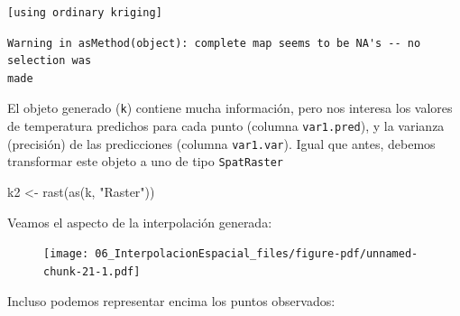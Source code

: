 \documentclass[
  letterpaper,
  DIV=11,
  numbers=noendperiod]{scrreprt}
\newenvironment{Shaded}{\begin{snugshade}}{\end{snugshade}}
\newcommand{\AttributeTok}[1]{\textcolor[rgb]{0.40,0.45,0.13}{#1}}
\newcommand{\DecValTok}[1]{\textcolor[rgb]{0.68,0.00,0.00}{#1}}
\newcommand{\FloatTok}[1]{\textcolor[rgb]{0.68,0.00,0.00}{#1}}
\newcommand{\FunctionTok}[1]{\textcolor[rgb]{0.28,0.35,0.67}{#1}}
\newcommand{\NormalTok}[1]{\textcolor[rgb]{0.00,0.23,0.31}{#1}}
\newcommand{\OtherTok}[1]{\textcolor[rgb]{0.00,0.23,0.31}{#1}}
\newcommand{\SpecialCharTok}[1]{\textcolor[rgb]{0.37,0.37,0.37}{#1}}
\newcommand{\StringTok}[1]{\textcolor[rgb]{0.13,0.47,0.30}{#1}}
\begin{document}
\begin{verbatim}
[using ordinary kriging]
\end{verbatim}

\begin{verbatim}
Warning in asMethod(object): complete map seems to be NA's -- no selection was
made
\end{verbatim}

El objeto generado (\texttt{k}) contiene mucha información, pero nos
interesa los valores de temperatura predichos para cada punto (columna
\texttt{var1.pred}), y la varianza (precisión) de las predicciones
(columna \texttt{var1.var}). Igual que antes, debemos transformar este
objeto a uno de tipo \texttt{SpatRaster}

\begin{Shaded}
\begin{Highlighting}[]
\NormalTok{k2 }\OtherTok{\textless{}{-}} \FunctionTok{rast}\NormalTok{(}\FunctionTok{as}\NormalTok{(k, }\StringTok{"Raster"}\NormalTok{))}
\end{Highlighting}
\end{Shaded}

Veamos el aspecto de la interpolación generada:

\begin{Shaded}
\end{Shaded}

\begin{figure}[H]

{\centering \texttt{[image: 06\_InterpolacionEspacial\_files/figure-pdf/unnamed-chunk-21-1.pdf]}

}

\end{figure}

Incluso podemos representar encima los puntos observados:

\begin{Shaded}
\end{Shaded}
\end{document}
